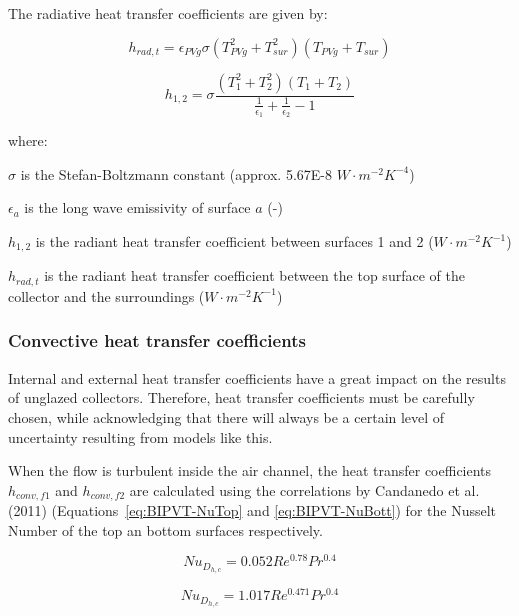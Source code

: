 The radiative heat transfer coefficients are given by:


\begin{equation}
h_{rad,t}=\epsilon_{PVg} \sigma \left(T^{2}_{PVg}+T^{2}_{sur} \right)\left(T_{PVg}+T_{sur}\right)
\label{eq:BIPVT-h-rad-t}
\end{equation}


\begin{equation}
h_{1,2}=\sigma \frac{\left(T^{2}_{1}+T^{2}_{2} \right)\left(T_{1}+T_{2}\right)}{\frac{1}{\epsilon_{1}}+\frac{1}{\epsilon_{2}}-1}
\label{eq:BIPVT-h-rad-1-2}
\end{equation}

where:

\(\sigma\) is the Stefan-Boltzmann constant (approx. 5.67E-8 \(W\cdot m^{−2}K^{−4}\))

\(\epsilon_{a}\) is the long wave emissivity of surface \(a\) (-)

\(h_{1,2}\) is the radiant heat transfer coefficient between surfaces 1 and 2 (\(W\cdot m^{−2}K^{−1}\))

\(h_{rad,t}\) is the radiant heat transfer coefficient between the top surface of the collector and the surroundings (\(W\cdot m^{−2}K^{−1}\))

\subsubsection{Convective heat transfer coefficients}\label{BIPVT-htc-conv}

Internal and external heat transfer coefficients have a great impact on the results of unglazed collectors. Therefore, heat transfer coefficients must be carefully chosen, while acknowledging that there will always be a certain level of uncertainty resulting from models like this.

When the flow is turbulent inside the air channel, the heat transfer coefficients \(h_{conv,f1}\) and \(h_{conv,f2}\) are calculated using the correlations by Candanedo et al. (2011) (Equations~\ref{eq:BIPVT-NuTop} and \ref{eq:BIPVT-NuBott}) for the Nusselt Number of the top an bottom surfaces respectively.

\begin{equation}
Nu_{D_{h,c}}=0.052Re^{0.78}Pr^{0.4}
\label{eq:BIPVT-NuTop}
\end{equation}

\begin{equation}
Nu_{D_{h,c}}=1.017Re^{0.471}Pr^{0.4}
\label{eq:BIPVT-NuBott}
\end{equation}


